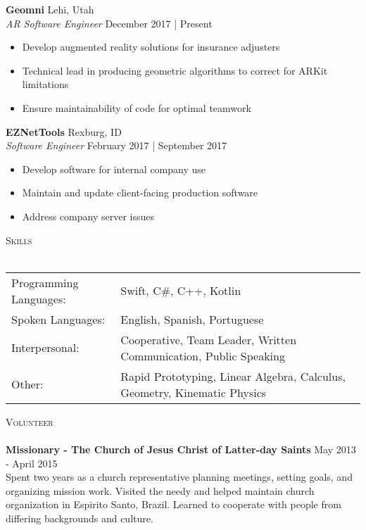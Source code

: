 \documentclass[a4paper]{article}
\newcommand{\lineunder} {
    \vspace*{-8pt} \\
    \hspace*{-18pt} \hrulefill \\
}
\newcommand{\header} [1] {
    {\hspace*{-18pt}\vspace*{6pt} \textsc{#1}}
    \vspace*{-6pt} \lineunder
}
\begin{document}
\textbf{Geomni} \hfill Lehi, Utah\\
\textit{AR Software Engineer} \hfill December 2017 | Present\\
\vspace{-1mm}
\begin{itemize} \itemsep 1pt
	\item Develop augmented reality solutions for insurance adjusters
	\item Technical lead in producing geometric algorithms to correct for ARKit limitations
	\item Ensure maintainability of code for optimal teamwork
\end{itemize}
\textbf{EZNetTools} \hfill Rexburg, ID\\
\textit{Software Engineer} \hfill February 2017 | September 2017\\
\vspace{-1mm}
\begin{itemize} \itemsep 1pt
	\item Develop software for internal company use
	\item Maintain and update client-facing production software
	\item Address company server issues
\end{itemize}

\header{Skills}
\begin{tabular}{ l l }
	Programming Languages: & Swift, C\#, C++, Kotlin                                                  \\
	Spoken Languages:      & English, Spanish, Portuguese                                             \\
	Interpersonal:         & Cooperative, Team Leader, Written Communication, Public Speaking         \\
	Other:                 & Rapid Prototyping, Linear Algebra, Calculus, Geometry, Kinematic Physics \\
\end{tabular}
\vspace{2mm}

\header{Volunteer}
\textbf{Missionary - The Church of Jesus Christ of Latter-day Saints} \hfill May 2013 - April 2015\\
Spent two years as a church representative planning meetings, setting goals, and organizing mission work. Visited the needy and helped maintain church organization in Espirito Santo, Brazil. Learned to cooperate with people from differing backgrounds and culture.\\
\vspace*{2mm}

\ 
\end{document}
